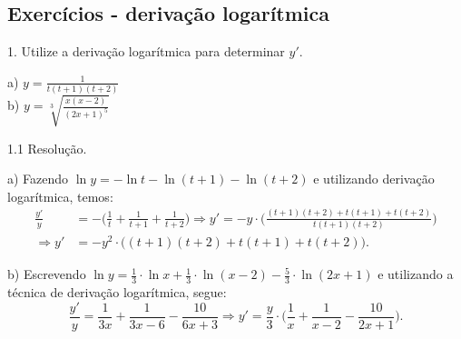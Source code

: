 \documentclass{article}
\begin{document}
{\begin{newpage}
\subsection{Exercícios - derivação logarítmica}
\par
\vspace{0.3cm}
\begin{flushleft}
1. Utilize a derivação logarítmica para determinar $y'$.
\end{flushleft}
\par
\begin{multicols}{2}
a) $y=\displaystyle{\frac{1}{t(t+1)(t+2)}}$\\
b) $y=\displaystyle{\sqrt[3]{\frac{x(x-2)}{(2x+1)^5}}}$
\end{multicols}
\par
\vspace{0.3cm}
\begin{flushleft}
1.1 Resolução.
\end{flushleft}
\par
a) Fazendo $\ln{y} = -\ln{t} - \ln{(t+1)} - \ln{(t+2)}$ e utilizando derivação logarítmica, temos:
\begin{equation*} \displaystyle{\begin{split}
\frac{y'}{y}&= -\Big(\frac{1}{t} + \frac{1}{t+1} + \frac{1}{t+2}\Big) \Rightarrow y'=-y\cdot\Big(\frac{(t+1)(t+2) + t(t+1) + t(t+2)}{t(t+1)(t+2)}\Big) \\
\Rightarrow y'&=-y^{2}\cdot\Big( (t+1)(t+2) + t(t+1) + t(t+2) \Big). \end{split}} \end{equation*} 
\par
\vspace{0.3cm}
b) Escrevendo $\ln{y} = \displaystyle{\frac{1}{3}\cdot\ln{x} + \frac{1}{3}\cdot\ln{(x-2)} - \frac{5}{3}\cdot\ln{(2x+1)}} $ e utilizando a técnica de derivação logarítmica, segue:
\begin{equation*} \displaystyle{\frac{y'}{y} = \frac{1}{3x} + \frac{1}{3x-6} - \frac{10}{6x+3} \Rightarrow y'=\frac{y}{3}\cdot\Big(\frac{1}{x} + \frac{1}{x-2} - \frac{10}{2x+1}\Big)} .\end{equation*}
\par
\vspace{0.3cm}

\end{newpage}}
\end{document}
